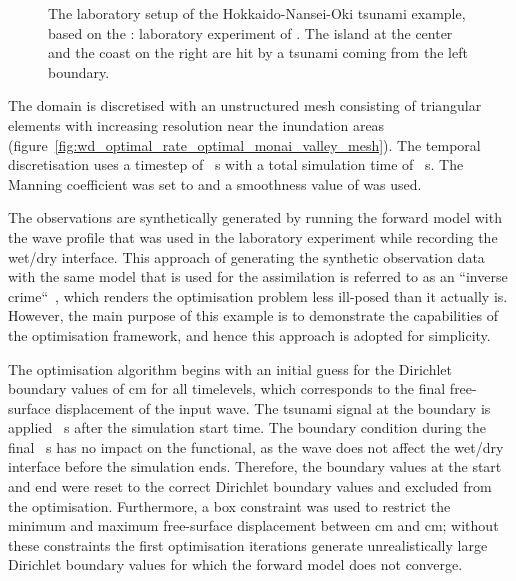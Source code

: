\documentclass[prodmode,acmtoms]{acmsmall}
\begin{document}
\begin{figure}[bt]
\centering
{}
     \caption{The laboratory setup of the Hokkaido-Nansei-Oki tsunami example, based on the : laboratory experiment of \protect{}. The island at the center and the coast on the right are hit by a tsunami coming from the left boundary.} 
\end{figure}

The domain is discretised with an unstructured mesh consisting of  triangular elements with increasing resolution near the inundation areas (figure~\ref{fig:wd_optimal_rate_optimal_monai_valley_mesh}). 
The temporal discretisation uses a timestep of ~s with a total simulation time of ~s. The Manning coefficient was set to 
and a smoothness value of  was used.

The observations  are synthetically generated by running the forward model with the wave profile that was used in the laboratory experiment while recording the wet/dry interface. 
This approach of generating the synthetic observation data with the same model that is used for the assimilation is referred to as an ``inverse crime``~\cite{kaipo2005}, 
which renders the optimisation problem less ill-posed than it actually is. 
However, the main purpose of this example is to demonstrate the capabilities of the optimisation framework, and hence this approach is adopted for simplicity.

The optimisation algorithm begins with an initial guess for the Dirichlet boundary values of  cm for all timelevels, which corresponds to the final free-surface displacement of the input wave.
The tsunami signal at the boundary is applied ~s after the simulation start time.
The boundary condition during the final ~s has no impact on the functional,
as the wave does not affect the wet/dry interface before the simulation ends. 
Therefore, the boundary values at the start and end were reset to the correct Dirichlet boundary values and excluded from the optimisation.
Furthermore, a box constraint was used to restrict the minimum and maximum free-surface displacement between  cm and  cm; 
without these constraints the first optimisation iterations generate unrealistically large Dirichlet boundary values for which the forward model does not converge.
\end{document}
